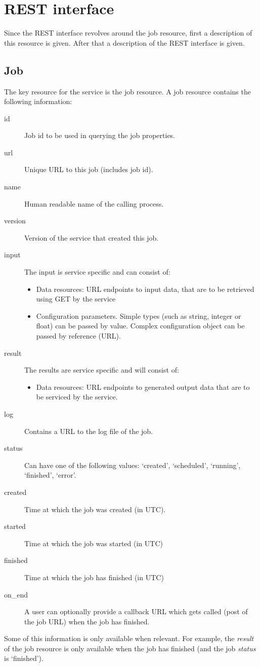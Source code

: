 \documentclass[a4paper]{article}
\begin{document}
\section{REST interface}

Since the REST interface revolves around the job resource, first a description
of this resource is given. After that a description of the REST interface is
given. 

\subsection{Job}

The key resource for the service is the job resource. A job resource contains
the following information:
\begin{description}
  \item[id] Job id to be used in querying the job properties.
  \item[url] Unique URL to this job (includes job id).
  \item[name] Human readable name of the calling process.
  \item[version] Version of the service that created this job.
  \item[input] The input is service specific and can consist of:
    \begin{itemize}
      \item Data resources: URL endpoints to input data, that are to be
      retrieved using GET by the service
      \item Configuration parameters. Simple types (such as string, integer or
      float) can be passed by value. Complex configuration object can be passed
      by reference (URL). 
    \end{itemize}
  \item[result] The results are service specific and will consist of:
    \begin{itemize}
      \item Data resources: URL endpoints to generated output data that are to
      be serviced by the service.
    \end{itemize}
  \item[log] Contains a URL to the log file of the job. 
  \item[status] Can have one of the following values: `created', `scheduled',
  `running', `finished', `error'.
  \item[created] Time at which the job was created (in UTC).
  \item[started] Time at which the job was started (in UTC)
  \item[finished] Time at which the job has finished (in UTC)
  \item[on\_end] A user can optionally provide a callback URL which gets called
  (post of the job URL) when the job has finished. 
\end{description}
Some of this information is only available when relevant. For example, the
\emph{result} of the job resource is only available when the job has finished
(and the job \emph{status} is `finished'). 
\end{document}
